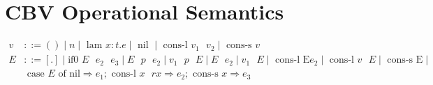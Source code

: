 \documentclass{article}
\begin{document}
\section{CBV Operational Semantics}
\begin{align*}
v &::= () \mid n \mid \text{ lam } x:t.e \mid \text{ nil } \mid \text{ cons-l } v_1 \text{ } v_2 \mid \text{ cons-s } v\\
E &::= [.] \mid \text{if0 } E \text{ } e_2 \text{ } e_3 \mid E \text{ } p \text{ } e_2 \mid v_1 \text{ } p \text{ } E \mid E \text{ } e_2 \mid v_1 \text{ } E \mid \text{ cons-l E} e_2 \mid \text{ cons-l } v \text{ } E \mid \text{ cons-s E} \mid \\
&\text{ case } E \text{ of nil} \Rightarrow e_1; \text{ cons-l } x \text{ } rx \Rightarrow e_2; \text{ cons-s } x \Rightarrow e_3
\end{align*}





 
\end{document}
